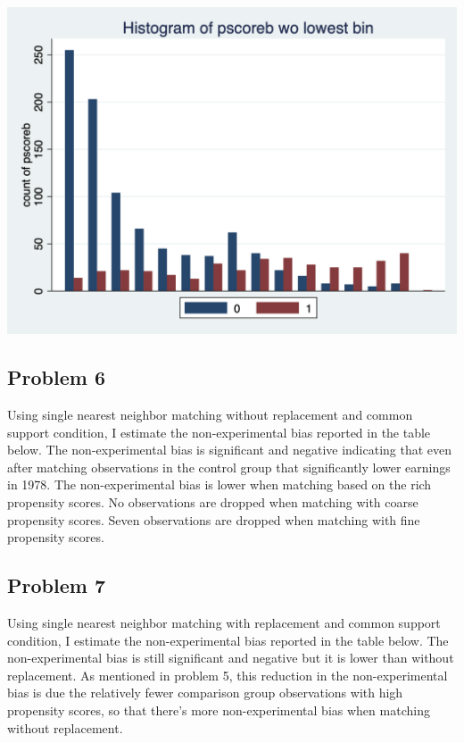 \documentclass{article}
\begin{document}
\begin{center}
\includegraphics[scale = 0.5]{figure_5b_2}
\end{center}

\pagebreak

\subsection*{Problem 6}

Using single nearest neighbor matching without replacement and common support condition, I estimate the non-experimental bias reported in the table below.  The non-experimental bias is significant and negative indicating that even after matching observations in the control group that significantly lower earnings in 1978.  The non-experimental bias is lower when matching based on the rich propensity scores.  No observations are dropped when matching with coarse propensity scores.  Seven observations are dropped when matching with fine propensity scores.

\begin{center}

\end{center}

\subsection*{Problem 7}

Using single nearest neighbor matching with replacement and common support condition, I estimate the non-experimental bias reported in the table below.  The non-experimental bias is still significant and negative but it is lower than without replacement.  As mentioned in problem 5, this reduction in the non-experimental bias is due the relatively fewer comparison group observations with high propensity scores, so that there's more non-experimental bias when matching without replacement.
\end{document}
